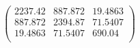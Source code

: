 \documentclass{article}
\begin{document}
\[\left(
\begin{array}{ccc}
 2237.42 & 887.872 & 19.4863 \\
 887.872 & 2394.87 & 71.5407 \\
 19.4863 & 71.5407 & 690.04 \\
\end{array}
\right)\]
\end{document}
